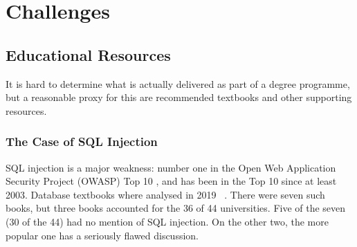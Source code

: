 \documentclass[a4paper,11pt]{article}
\begin{document}




\section*{Challenges} \label{sec}
\subsection*{Educational Resources}\label{sec:EDResource}
It is hard to determine what is actually delivered as part of a degree programme, but a reasonable proxy for this are recommended textbooks and other supporting resources.
\subsubsection*{The Case of SQL Injection}\label{sec:SQL}
SQL injection is a major weakness: number one in the Open Web Application Security Project (OWASP) Top 10 , and has been in the Top 10 since at least 2003. Database textbooks where analysed in 2019 ~\cite{Drop2019}.  There were seven such books, but three books accounted for the 36 of 44 universities. Five of the seven (30 of the 44) had no mention of SQL injection. On the other two, the more popular one has a seriously flawed discussion. 
\end{document}
